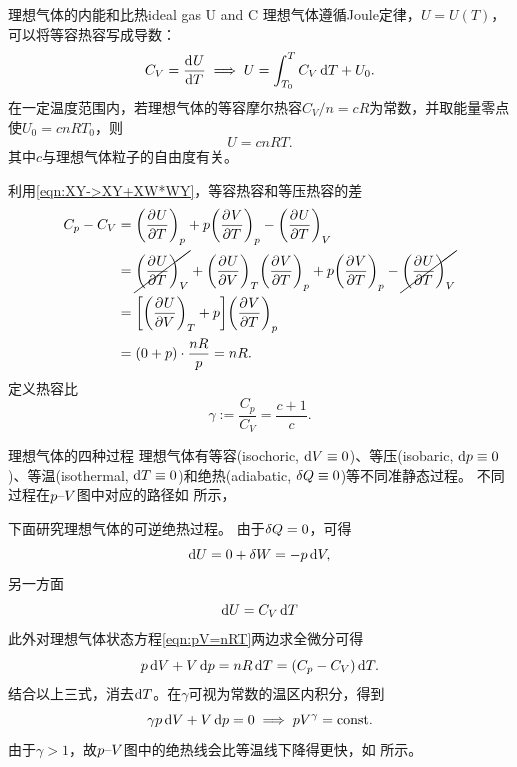\begin{example}
	{理想气体的内能和比热}{ideal gas U and C}
	理想气体遵循Joule定律，$U = U(T)$，可以将等容热容写成导数：
	\begin{equation}
		\label{eqn:C_V->U}
		C_V = \dv UT \implies U = \int_{T_0}^TC_V\d T + U_0.
	\end{equation}
	在一定温度范围内，若理想气体的等容摩尔热容$C_V/n = cR$为常数，并取能量零点使$U_0 = cnRT_0$，则
	\begin{equation}
		U = cnRT.
	\end{equation}
	其中$c$与理想气体粒子的自由度有关。

	利用\eqref{eqn:XY->XY+XW*WY}，等容热容和等压热容的差
	\begin{align}
		\notag
		C_p - C_V &= \pvat{U}{T}{p} + p\pvat{V}{T}{p} - \pvat{U}{T}{V}\\
		\notag
		&= \cancel{\pvat{U}{T}{V}} + \pvat{U}{V}{T}\pvat{V}{T}{p} + p\pvat{V}{T}{p} - \cancel{\pvat{U}{T}{V}}\\
		&= \biggb{\pvat{U}{V}{T} + p}\pvat{V}{T}{p}\\
		&= (0 + p) \cdot \frac{nR}p = nR.
	\end{align}
	定义热容比
	\begin{equation}
		\gamma := \frac{C_p}{C_V} = \frac{c + 1}{c}.
	\end{equation}
\end{example}

\begin{example}
	{理想气体的四种过程}{}
	理想气体有等容(isochoric, $\d V \equiv 0$)、等压(isobaric, $\d p \equiv 0$)、等温(isothermal, $\d T \equiv 0$)和绝热(adiabatic, $\vd Q \equiv 0$)等不同准静态过程。
	不同过程在$p\vs V$图中对应的路径如 所示，
	\begin{notecaptionblock}
		\label{fig:ideal p-V}
	\end{notecaptionblock}
	\tcblower
	下面研究理想气体的可逆绝热过程。
	由于$\vd Q = 0$，可得
	\[
		\d U = 0 + \vd W = -p\d V,
	\]
	另一方面
	\[
		\d U = C_V\d T
	\]
	此外对理想气体状态方程\eqref{eqn:pV=nRT}两边求全微分可得
	\[
		p\d V + V\d p = nR\d T = (C_p - C_V)\d T.
	\]
	结合以上三式，消去$\d T$。在$\gamma$可视为常数的温区内积分，得到
	\begin{equation}
		\label{eqn:adiabatic}
		\gamma p\d V + V\d p = 0 \implies pV^\gamma = \const.
	\end{equation}
	由于$\gamma > 1$，故$p\vs V$图中的绝热线会比等温线下降得更快，如 所示。
\end{example}

